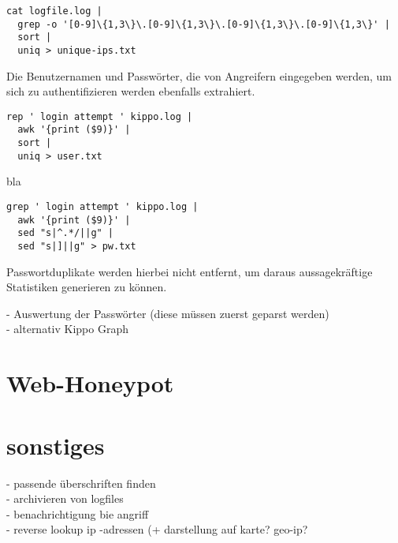 \begin{lstlisting}[style=customc]
cat logfile.log | 
  grep -o '[0-9]\{1,3\}\.[0-9]\{1,3\}\.[0-9]\{1,3\}\.[0-9]\{1,3\}' |
  sort |
  uniq > unique-ips.txt
\end{lstlisting}

Die Benutzernamen und Passwörter, die von Angreifern eingegeben werden, um sich zu authentifizieren werden ebenfalls extrahiert.


\begin{lstlisting}[style=customc]
rep ' login attempt ' kippo.log |
  awk '{print ($9)}' |
  sort |
  uniq > user.txt
\end{lstlisting}

bla

\begin{lstlisting}[style=customc]
grep ' login attempt ' kippo.log |
  awk '{print ($9)}' |
  sed "s|^.*/||g" |
  sed "s|]||g" > pw.txt
\end{lstlisting}

Passwortduplikate werden hierbei nicht entfernt, um daraus aussagekräftige Statistiken generieren zu können.


- Auswertung der Passwörter (diese müssen zuerst geparst werden)\\
- alternativ Kippo Graph

\section{Web-Honeypot}
\label{sec:Web-Honeypot}


\section{sonstiges}
\label{sec:sonstiges}

- passende überschriften finden\\
- archivieren von logfiles\\
- benachrichtigung bie angriff\\
- reverse lookup ip -adressen (+ darstellung auf karte? geo-ip?\\

